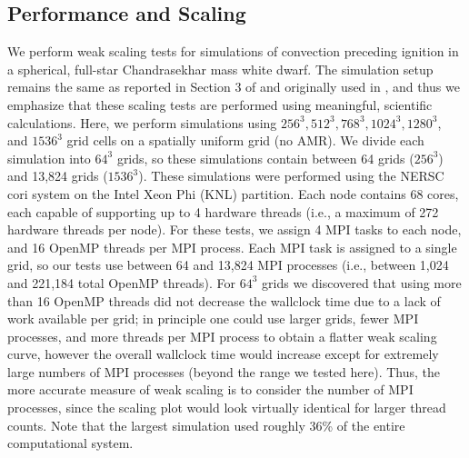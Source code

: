 \documentclass{aastex62}
\begin{document}
\subsection{Performance and Scaling}\label{sec:scaling}
We perform weak scaling tests for simulations of convection preceding ignition in a spherical, full-star Chandrasekhar mass white dwarf. 
The simulation setup remains the same as reported in Section 3 of \cite{MAESTRO_AMR} and originally used in \cite{MAESTRO_convection}, and thus we emphasize that these scaling tests are performed using meaningful, scientific calculations.
Here, we perform simulations using $256^3, 512^3, 768^3, 1024^3, 1280^3$, and $1536^3$ grid cells on a spatially uniform grid (no AMR).
We divide each simulation into $64^3$ grids, so these simulations contain between 64 grids ($256^3$) and 13,824 grids ($1536^3$).
These simulations were performed using the NERSC cori system on the Intel Xeon Phi (KNL) partition.
Each node contains 68 cores, each capable of supporting up to 4 hardware threads (i.e., a maximum of 272 hardware threads per node).
For these tests, we assign 4 MPI tasks to each node, and 16 OpenMP threads per MPI process.
Each MPI task is assigned to a single grid, so our tests use between 64 and 13,824 MPI processes (i.e., between 1,024 and 221,184 total OpenMP threads).
For $64^3$ grids we discovered that using more than 16 OpenMP threads did not decrease the wallclock time due to a lack of work available per grid; in principle one could use larger grids, fewer MPI processes, and more threads per MPI process to obtain a flatter weak scaling curve, however the overall wallclock time would increase except for extremely large numbers of MPI processes (beyond the range we tested here).
Thus, the more accurate measure of weak scaling is to consider the number of MPI processes, since the scaling plot would look virtually identical for larger thread counts.
Note that the largest simulation used roughly 36\% of the entire computational system.
\end{document}

